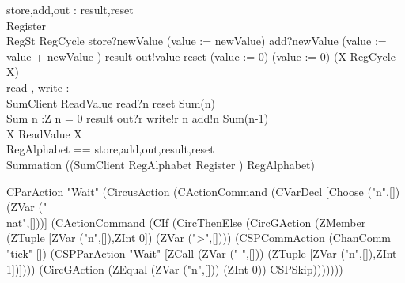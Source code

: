 \documentclass{llncs}
\begin{document}
\begin{circus}
\circchannel store,add,out : \nat 
\also \circchannel result,reset \\
\also \circprocess Register \circdef\\
\circbegin \circstate RegSt 
RegCycle \circdef store?newValue \then (value := newValue)
                \extchoice add?newValue \then (value := value + newValue )
                \extchoice result \then out!value \then \Skip
                \extchoice reset \then (value := 0)
\circspot (value := 0) \circseq (\circmu X \circspot RegCycle \circseq X) 
\circend\\

\also \circchannel read , write : \nat\\
\also \circprocess SumClient \circdef
\circbegin
ReadValue \circdef read?n \then reset \then Sum(n)\\
Sum \circdef n :Z \circspot 
    \lcircguard n = 0 \rcircguard \circguard result \then out?r \then write!r \then \Skip
    \extchoice 
    \lcircguard n  \rcircguard \circguard add!n \then Sum(n-1)\\
\circspot \circmu X \circspot ReadValue \circseq X
\circend\\
\circchannelset RegAlphabet == \lchanset store,add,out,result,reset \rchanset\\
\circprocess Summation \circdef ((SumClient \lpar RegAlphabet \rpar Register ) \circhide RegAlphabet)\\

\end{circus}
CParAction "Wait" (CircusAction (CActionCommand (CVarDecl [Choose ("n",[]) (ZVar ("\\nat",[]))] (CActionCommand (CIf (CircThenElse (CircGAction (ZMember (ZTuple [ZVar ("n",[]),ZInt 0]) (ZVar (">",[]))) (CSPCommAction (ChanComm "tick" []) (CSPParAction "Wait" [ZCall (ZVar ("-",[])) (ZTuple [ZVar ("n",[]),ZInt 1])]))) (CircGAction (ZEqual (ZVar ("n",[])) (ZInt 0)) CSPSkip)))))))
\end{document}
